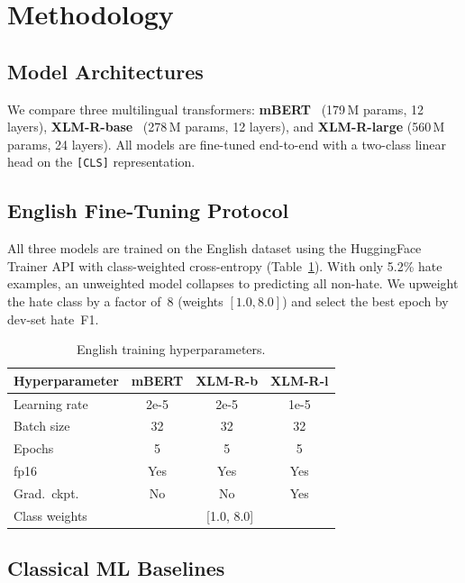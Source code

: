 \documentclass{article}
\begin{document}
\section{Methodology}
\label{sec:method}

\subsection{Model Architectures}

We compare three multilingual transformers:
\textbf{mBERT}~\citep{devlin2019bert} (179\,M params, 12 layers),
\textbf{XLM-R-base}~\citep{conneau2020unsupervised} (278\,M params, 12 layers),
and \textbf{XLM-R-large} (560\,M params, 24 layers).
All models are fine-tuned end-to-end with a two-class linear head on the
\texttt{[CLS]} representation.

\subsection{English Fine-Tuning Protocol}

All three models are trained on the English dataset using the HuggingFace
Trainer API with class-weighted cross-entropy (Table~\ref{tab:hparams}).
With only 5.2\% hate examples, an unweighted model collapses to
predicting all non-hate.
We upweight the hate class by a factor of~8 (weights $[1.0, 8.0]$) and
select the best epoch by dev-set hate~F1.

\begin{table}[h]
\centering
\caption{English training hyperparameters.}
\label{tab:hparams}
\vskip 0.05in
\begin{small}
\begin{tabular}{lccc}
\toprule
Hyperparameter & mBERT & XLM-R-b & XLM-R-l \\
\midrule
Learning rate     & 2e-5  & 2e-5  & 1e-5  \\
Batch size        & 32    & 32    & 32    \\
Epochs            & 5     & 5     & 5     \\
fp16              & Yes   & Yes   & Yes   \\
Grad.\ ckpt.      & No    & No    & Yes   \\
Class weights     & \multicolumn{3}{c}{[1.0, 8.0]} \\
\bottomrule
\end{tabular}
\end{small}
\end{table}

\subsection{Classical ML Baselines}
\end{document}
